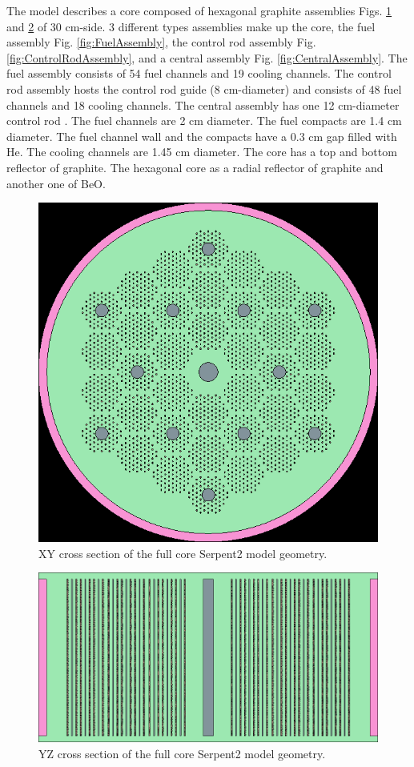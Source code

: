 \documentclass[11pt,letterpaper]{article}
\begin{document}
The model describes a core composed of hexagonal graphite assemblies Figs. \ref{fig:FullXY} and \ref{fig:FullYZ} of 30 cm-side.
3 different types assemblies make up the core, the fuel assembly Fig. \ref{fig:FuelAssembly}, the control rod assembly Fig. \ref{fig:ControlRodAssembly}, and a central assembly Fig. \ref{fig:CentralAssembly}.
The fuel assembly consists of 54 fuel channels and 19 cooling channels.
The control rod assembly hosts the control rod guide (8 cm-diameter) and consists of 48 fuel channels and 18 cooling channels.
The central assembly has one 12 cm-diameter control rod \cite{hawari_development_2018}.
The fuel channels are 2 cm diameter.
The fuel compacts are 1.4 cm diameter.
The fuel channel wall and the compacts have a 0.3 cm gap filled with He.
The cooling channels are 1.45 cm diameter.
The core has a top and bottom reflector of graphite.
The hexagonal core as a radial reflector of graphite and another one of BeO.

\begin{figure}[H]
	\centering
	\includegraphics[width=0.45\linewidth]{figures/MMR_full_stack_geom1.png}
	\hfill
	\caption{XY cross section of the full core Serpent2 model geometry.}
	\label{fig:FullXY}
\end{figure}

\begin{figure}[H]
	\centering
	\includegraphics[width=0.6\linewidth]{figures/MMR_full_stack_geom2.png}
	\hfill
	\caption{YZ cross section of the full core Serpent2 model geometry.}
	\label{fig:FullYZ}
\end{figure}
\end{document}
